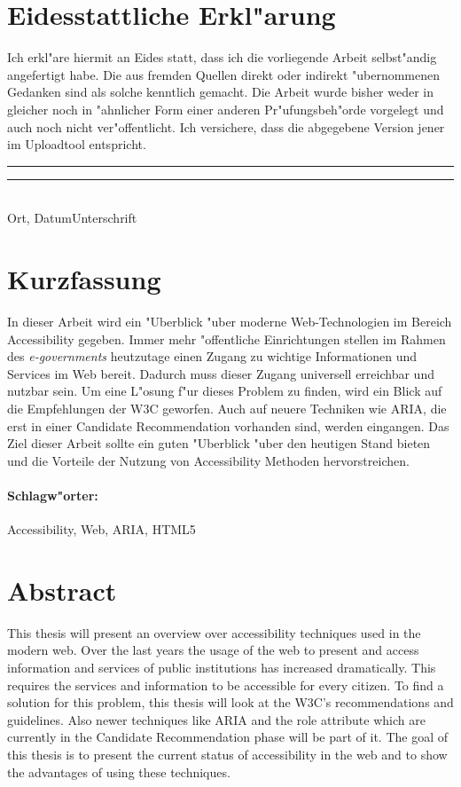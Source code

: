 \documentclass[a4paper,bibtotoc,oneside]{scrbook}
\begin{document}
\newpage


\section*{Eidesstattliche Erkl"arung}\thispagestyle{empty}
\glqq Ich erkl"are hiermit an Eides statt, dass ich die vorliegende Arbeit selbst"andig angefertigt habe. 
Die aus fremden Quellen direkt oder indirekt "ubernommenen Gedanken sind als solche kenntlich gemacht. 
Die Arbeit wurde bisher weder in gleicher noch in "ahnlicher Form einer anderen Pr"ufungsbeh"orde vorgelegt
und auch noch nicht ver"offentlicht. Ich versichere, dass die abgegebene Version jener im Uploadtool entspricht.\grqq\\[5\baselineskip]
\rule{5cm}{0.2pt}\hfill\rule{5cm}{0.2pt}\\
\phantom{Datum }Ort, Datum\hfill Unterschrift\hspace{15mm}

\newpage


\section*{Kurzfassung}\thispagestyle{empty}
In dieser Arbeit wird ein "Uberblick "uber moderne Web-Technologien im Bereich
Accessibility gegeben. Immer mehr "offentliche Einrichtungen stellen im Rahmen des \emph{e-governments} heutzutage einen Zugang zu wichtige Informationen und Services im Web bereit. Dadurch muss dieser Zugang universell erreichbar und nutzbar sein. Um eine L"osung f"ur dieses Problem zu finden, wird ein Blick auf die Empfehlungen der W3C geworfen. Auch auf neuere Techniken wie ARIA, die erst in einer Candidate Recommendation vorhanden sind, werden eingangen. Das Ziel dieser Arbeit sollte ein guten "Uberblick "uber den heutigen Stand bieten und die Vorteile der Nutzung von Accessibility Methoden hervorstreichen. 
\vfill
\paragraph*{Schlagw"orter:} Accessibility, Web, ARIA, HTML5


\newpage

\section*{Abstract}\thispagestyle{empty}
This thesis will present an overview over accessibility techniques used in the
modern web. Over the last years the usage of the web to present and
access information and services of public institutions has increased
dramatically. This requires the services and information to be accessible for
every citizen. To find a solution for this problem, this thesis will look at
the W3C's recommendations and guidelines. Also newer techniques like ARIA
and the role attribute which are currently in the Candidate Recommendation
phase will be part of it. The goal of this thesis is to present the current
status of accessibility in the web and to show the advantages of using these
techniques.
\vfill
\end{document}
